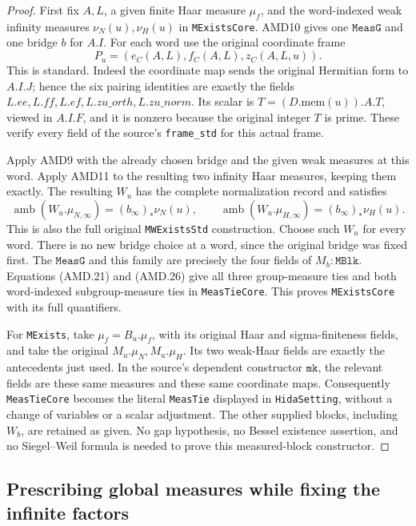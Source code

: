 \begin{proof}
First fix \(A,L\), a given finite Haar measure \(\mu_f\),
and the word-indexed weak infinity measures
\(\nu_N(u),\nu_H(u)\) in \texttt{MExistsCore}.  AMD10 gives
one \(\texttt{MeasG}\) and one bridge \(b\) for \(A.I\).
For each word use the original coordinate frame
\[
       P_u=(e_C(A,L),f_C(A,L),z_C(A,L,u)).
 \tag{AMD.25}
\]
This is standard.  Indeed the coordinate map sends the original
Hermitian form to \(A.I.J\); hence the six pairing identities
are exactly the fields \(L.ee,L.ff,L.ef,L.zu\_orth,L.zu\_norm\).
Its scalar is \(T=(D.\mathrm{mem}(u)).A.T\), viewed in \(A.I.F\),
and it is nonzero because the original integer \(T\) is prime.
These verify every field of the source's \texttt{frame\_std}
for this actual frame.

Apply AMD9 with the already chosen bridge and the given weak
measures at this word.  Apply AMD11 to the resulting two
infinity Haar measures, keeping them exactly.  The resulting
\(W_u\) has the complete normalization record and satisfies
\[
 \operatorname{amb}(W_u.\mu_{N,\infty})
                   =(b_\infty)_*\nu_N(u),\qquad
 \operatorname{amb}(W_u.\mu_{H,\infty})
                   =(b_\infty)_*\nu_H(u).
 \tag{AMD.26}
\]
This is also the full original \texttt{MWExistsStd} construction.
Choose such \(W_u\) for every word.  There is no new bridge
choice at a word, since the original bridge was fixed first.
The \(\texttt{MeasG}\) and this family are precisely the
four fields of \(M_b:\texttt{MBlk}\).  Equations (AMD.21)
and (AMD.26) give all three group-measure ties and both
word-indexed subgroup-measure ties in \texttt{MeasTieCore}.
This proves \texttt{MExistsCore} with its full quantifiers.

For \texttt{MExists}, take \(\mu_f=B_u.\mu_f\), with its
original Haar and sigma-finiteness fields, and take the original
\(M_u.\mu_N,M_u.\mu_H\).  Its two weak-Haar fields are
exactly the antecedents just used.  In the source's dependent
constructor \(\texttt{mk}\), the relevant fields are these
same measures and these same coordinate maps.  Consequently
\texttt{MeasTieCore} becomes the literal \texttt{MeasTie}
displayed in \texttt{HidaSetting}, without a change of variables
or a scalar adjustment.  The other supplied blocks, including
\(W_b\), are retained as given.  No gap hypothesis, no Bessel
existence assertion, and no Siegel--Weil formula is needed to
prove this measured-block constructor.
\end{proof}

\subsection{Prescribing global measures while fixing the infinite factors}

